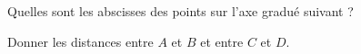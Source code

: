 
\begin{exercice}\label{exo2smath-0046}

    Quelles sont les abscisses des points sur l'axe gradué suivant ?

    \begin{center}
        
    \end{center}
    Donner les distances entre \( A\) et \( B\) et entre \( C\) et \( D\).

\end{exercice}
